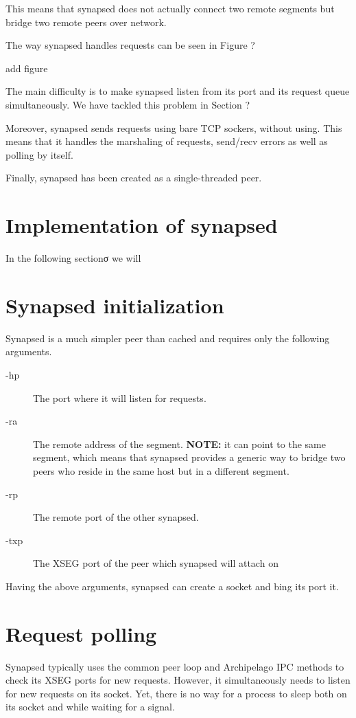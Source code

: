 This means that synapsed does not actually connect two remote segments
but bridge two remote peers over network.

The way synapsed handles requests can be seen in Figure ?

\fixme add figure

The main difficulty is to make synapsed listen from its port and its request 
queue simultaneously. We have tackled this problem in Section ?

Moreover, synapsed sends requests using bare TCP sockers, without using. This 
means that it handles the marshaling of requests, send/recv errors as well as 
polling by itself.

Finally, synapsed has been created as a single-threaded peer.

\section{Implementation of synapsed}

In the following sectionσ we will

\section{Synapsed initialization}

Synapsed is a much simpler peer than cached and requires only the following 
arguments.

\begin{description}
	\item[-hp] The port where it will listen for requests.
	\item[-ra] The remote address of the segment. \textbf{NOTE:} it can 
		point to the same segment, which means that synapsed provides a 
		generic way to bridge two peers who reside in the same host but 
		in a different segment.
	\item[-rp] The remote port of the other synapsed.
	\item[-txp] The XSEG port of the peer which synapsed will attach on
\end{description}

Having the above arguments, synapsed can create a socket and bing its port it.  

\section{Request polling}

Synapsed typically uses the common peer loop and Archipelago IPC methods to 
check its XSEG ports for new requests. However, it simultaneously needs to 
listen for new requests on its socket. Yet, there is no way for a process to 
sleep both on its socket and while waiting for a signal.

